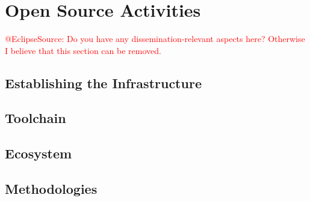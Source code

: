 
\section{Open Source Activities}\label{sct:open_source}
\textcolor{red}{@EclipseSource: Do you have any dissemination-relevant aspects here? Otherwise I believe that this section can be removed.}

\subsection{Establishing the Infrastructure}

\subsection{Toolchain}

\subsection{Ecosystem}

\subsection{Methodologies}
